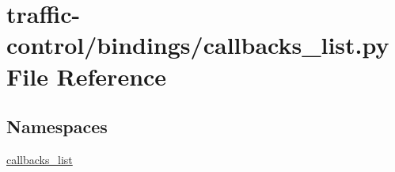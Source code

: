 \hypertarget{traffic-control_2bindings_2callbacks__list_8py}{}\section{traffic-\/control/bindings/callbacks\+\_\+list.py File Reference}
\label{traffic-control_2bindings_2callbacks__list_8py}
\subsection*{Namespaces}
\begin{DoxyCompactItemize}
\item 
 \hyperlink{namespacecallbacks__list}{callbacks\+\_\+list}
\end{DoxyCompactItemize}

